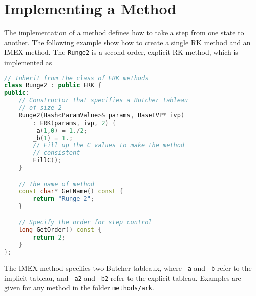 \documentclass[11pt]{article}
\begin{document}
\section{Implementing a Method}

The implementation of a method defines how to take a step from one state to another. The following example show how to create a single RK method and an IMEX method. The \verb=Runge2= is a second-order, explicit RK method, which is implemented as
\begin{lstlisting}[tabsize=4,language=c++]
// Inherit from the class of ERK methods
class Runge2 : public ERK {
public:
	// Constructor that specifies a Butcher tableau
	// of size 2
	Runge2(Hash<ParamValue>& params, BaseIVP* ivp)
		: ERK(params, ivp, 2) {
		_a(1,0) = 1./2;
		_b(1) = 1.;
		// Fill up the C values to make the method
		// consistent
		FillC();
	}

	// The name of method
	const char* GetName() const {
		return "Runge 2";
	}

	// Specify the order for step control	
	long GetOrder() const {
		return 2;
	}
};
\end{lstlisting}

The IMEX method specifies two Butcher tableaux, where \verb=_a= and \verb=_b= refer to the implicit tableau, and \verb=_a2= and \verb=_b2= refer to the explicit tableau. Examples are given for any method in the folder \verb=methods/ark=.





\end{document}
